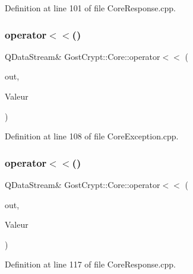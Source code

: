 Definition at line 101 of file Core\+Response.\+cpp.

\mbox{\label{namespace_gost_crypt_1_1_core_af513974446b16d994fd3c684fa4a66ec}} 
\subsubsection{\texorpdfstring{operator$<$$<$()}{operator<<()}\hspace{0.1cm}{\footnotesize\ttfamily [17/56]}}
{\footnotesize\ttfamily Q\+Data\+Stream\& Gost\+Crypt\+::\+Core\+::operator$<$$<$ (\begin{DoxyParamCaption}\item[{Q\+Data\+Stream \&}]{out,  }\item[{const \hyperlink{class_gost_crypt_1_1_core_1_1_mount_point_used}{Gost\+Crypt\+::\+Core\+::\+Mount\+Point\+Used} \&}]{Valeur }\end{DoxyParamCaption})}



Definition at line 108 of file Core\+Exception.\+cpp.

\mbox{\label{namespace_gost_crypt_1_1_core_a50717fd83a50d35d5362503effad3dc5}} 
\subsubsection{\texorpdfstring{operator$<$$<$()}{operator<<()}\hspace{0.1cm}{\footnotesize\ttfamily [18/56]}}
{\footnotesize\ttfamily Q\+Data\+Stream\& Gost\+Crypt\+::\+Core\+::operator$<$$<$ (\begin{DoxyParamCaption}\item[{Q\+Data\+Stream \&}]{out,  }\item[{const \hyperlink{struct_gost_crypt_1_1_core_1_1_dismount_volume_response}{Dismount\+Volume\+Response} \&}]{Valeur }\end{DoxyParamCaption})}



Definition at line 117 of file Core\+Response.\+cpp.

